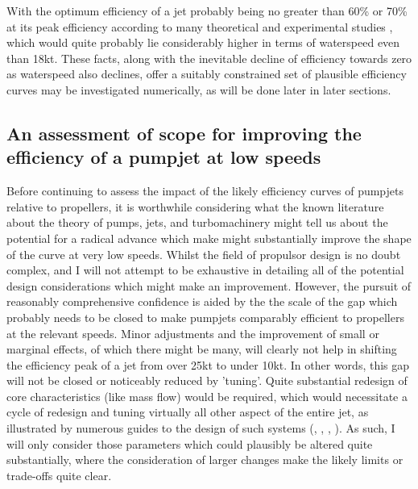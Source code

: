 \documentclass{article}\usepackage[]{graphicx}\usepackage[]{color}
\begin{document}
With the optimum efficiency of a jet probably being no greater than 60\% or 70\% at its peak efficiency according to many theoretical and experimental studies \parencite{lu2016cfd}, which would quite probably lie considerably higher in terms of waterspeed even than 18kt. These facts, along with the inevitable decline of efficiency towards zero as waterspeed also declines, offer a suitably constrained set of plausible efficiency curves may be investigated numerically, as will be done later in later sections.

\subsection{An assessment of scope for improving the efficiency of a pumpjet at low speeds}
Before continuing to assess the impact of the likely efficiency curves of pumpjets relative to propellers, it is worthwhile considering what the known literature about the theory of pumps, jets, and turbomachinery might tell us about the potential for a radical advance which make might substantially improve the shape of the curve at very low speeds.  Whilst the field of propulsor design is no doubt complex, and I will not attempt to be exhaustive in detailing all of the potential design considerations which might make an improvement.  However, the pursuit of reasonably comprehensive confidence is aided by the the scale of the gap which probably needs to be closed to make pumpjets comparably efficient to propellers at the relevant speeds.  Minor adjustments and the improvement of small or marginal effects, of which there might be many, will clearly not help in shifting the efficiency peak of a jet from over 25kt to under 10kt.  In other words, this gap will not be closed or noticeably reduced by 'tuning'.  Quite substantial redesign of core characteristics (like mass flow) would be required, which would necessitate a cycle of redesign and tuning virtually all other aspect of the entire jet, as illustrated by numerous guides to the design of such systems (\cite{bruce1974}, \cite{furuya1988}, \cite{mccormick1963design}, \cite{henderson1964}).  As such, I will only consider those parameters which could plausibly be altered quite substantially, where the consideration of larger changes make the likely limits or trade-offs quite clear.
\end{document}
